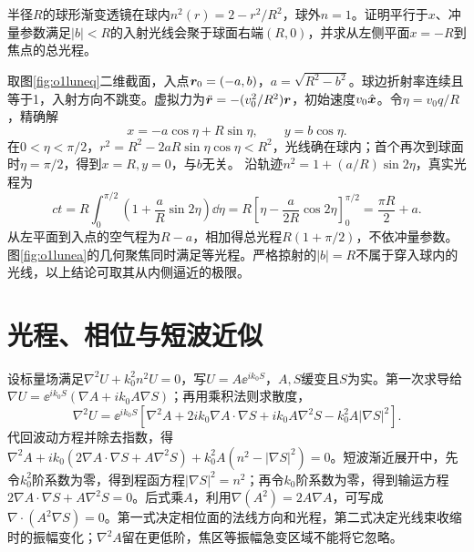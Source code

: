 \begin{example}\label{ex:o1luneburg}
半径$R$的球形渐变透镜在球内$n^2(r)=2-r^2/R^2$，球外$n=1$。证明平行于$x$、冲量参数满足$|b|<R$的入射光线会聚于球面右端$(R,0)$，并求从左侧平面$x=-R$到焦点的总光程。
\end{example}
\begin{solution}
取图\ref{fig:o1luneq}二维截面，入点$\bm{r}_0=(-a,b)$，$a=\sqrt{R^2-b^2}$。球边折射率连续且等于1，入射方向不跳变。虚拟力为$\ddot{\bm{r}}=-(v_0^2/R^2)\bm{r}$，初始速度$v_0\hat{\bm{x}}$。令$\eta=v_0q/R$，精确解
\[
 x=-a\cos\eta+R\sin\eta,\qquad y=b\cos\eta.
\]
在$0<\eta<\pi/2$，$r^2=R^2-2aR\sin\eta\cos\eta<R^2$，光线确在球内；首个再次到球面时$\eta=\pi/2$，得到$x=R,y=0$，与$b$无关。
沿轨迹$n^2=1+(a/R)\sin2\eta$，真实光程为
\[
 ct=R\int_0^{\pi/2}\left(1+\frac aR\sin2\eta\right)\dd\eta
 =R\left[\eta-\frac{a}{2R}\cos2\eta\right]_0^{\pi/2}
 =\frac{\pi R}{2}+a.
\]
从左平面到入点的空气程为$R-a$，相加得总光程$R(1+\pi/2)$，不依冲量参数。图\ref{fig:o1lunea}的几何聚焦同时满足等光程。严格掠射的$|b|=R$不属于穿入球内的光线，以上结论可取其从内侧逼近的极限。
\end{solution}

\section{光程、相位与短波近似}
设标量场满足$\nabla^2U+k_0^2n^2U=0$，写$U=A\ee^{ik_0S}$，$A,S$缓变且$S$为实。第一次求导给$\nabla U=\ee^{ik_0S}(\nabla A+ik_0A\nabla S)$；再用乘积法则求散度，
\[
 \nabla^2U=\ee^{ik_0S}\left[
 \nabla^2A+2ik_0\nabla A\cdot\nabla S
 +ik_0A\nabla^2S-k_0^2A|\nabla S|^2\right].
\]
代回波动方程并除去指数，得$\nabla^2A+ik_0(2\nabla A\cdot\nabla S+A\nabla^2S)+k_0^2A(n^2-|\nabla S|^2)=0$。短波渐近展开中，先令$k_0^2$阶系数为零，得到程函方程$|\nabla S|^2=n^2$；再令$k_0$阶系数为零，得到输运方程$2\nabla A\cdot\nabla S+A\nabla^2S=0$。后式乘$A$，利用$\nabla(A^2)=2A\nabla A$，可写成$\nabla\cdot(A^2\nabla S)=0$。第一式决定相位面的法线方向和光程，第二式决定光线束收缩时的振幅变化；$\nabla^2A$留在更低阶，焦区等振幅急变区域不能将它忽略。

